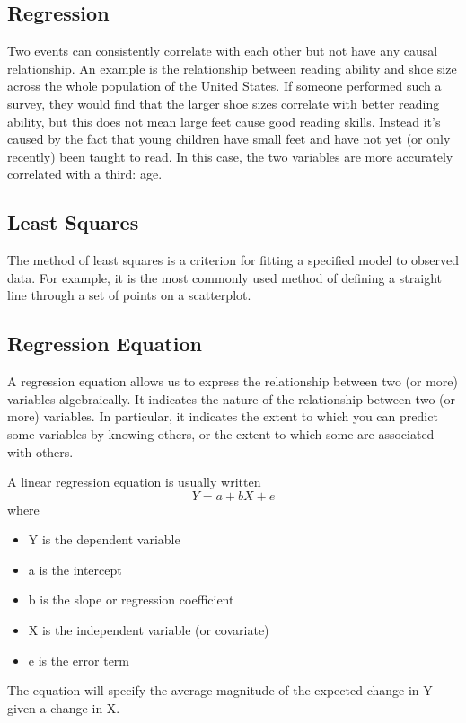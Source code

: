 \documentclass[]{report}
\begin{document}

\subsection{Regression}

Two events can consistently correlate with each other but not have any causal relationship. 
An example is the relationship between reading ability and shoe size across the whole population of the United States. 
If someone performed such a survey, they would find that the larger shoe sizes correlate with better reading ability, but 
this does not mean large feet cause good reading skills. Instead it's caused by the fact that young children have small 
feet and have not yet (or only recently) been taught to read. In this case, the two variables are more accurately correlated with a third: age.



\subsection{Least Squares}
The method of least squares is a criterion for fitting a specified model to observed data. 
For example, it is the most commonly used method of defining a straight line through a set of points on a scatterplot.




\subsection{Regression Equation}
A regression equation allows us to express the relationship between two (or more) variables algebraically. It indicates the nature of the relationship between two (or more) variables. In particular, it indicates the extent to which you can predict some variables by knowing others, or the extent to which some are associated with others.



A linear regression equation is usually written
\[Y = a + bX + e\]
where
\begin{itemize}
	\item Y is the dependent variable 
	\item a is the intercept 
	\item b is the slope or regression coefficient 
	\item X is the independent variable (or covariate) 
	\item e is the error term 
\end{itemize}
The equation will specify the average magnitude of the expected change in Y given a change in X.
\end{document}
